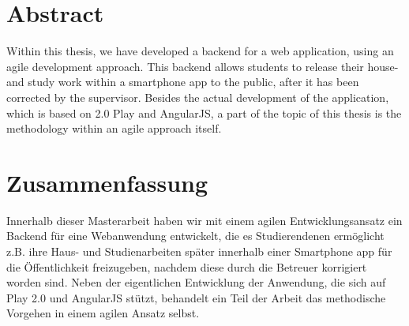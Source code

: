 \begingroup
\let\clearpage\relax
\let\cleardoublepage\relax
\let\cleardoublepage\relax

\chapter*{Abstract}
Within this thesis, we have developed a backend for a web application, using an agile development approach. This backend allows students to release their house- and study work within a smartphone app to the public, after it has been corrected by the supervisor.
Besides the actual development of the application, which is based on 2.0 Play and AngularJS, a part of the topic of this thesis is the methodology within an agile approach itself.

\vfill

\chapter*{Zusammenfassung}
Innerhalb dieser Masterarbeit haben wir mit einem agilen Entwicklungsansatz ein Backend f\"ur eine Webanwendung entwickelt, die es Studierendenen erm\"oglicht z.B. ihre Haus- und Studienarbeiten sp\"ater innerhalb einer Smartphone app f\"ur die \"Offentlichkeit freizugeben, nachdem diese durch die Betreuer korrigiert worden sind.   
Neben der eigentlichen Entwicklung der Anwendung, die sich auf Play 2.0 und AngularJS st\"utzt, behandelt ein Teil der Arbeit das methodische Vorgehen in einem agilen Ansatz selbst. 
\endgroup			

\vfill